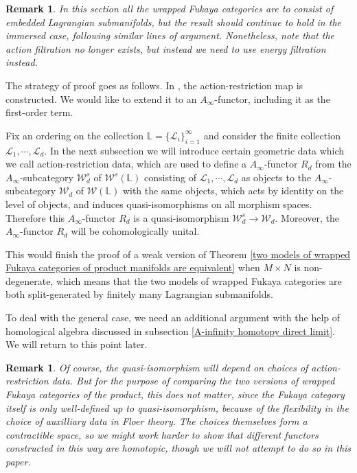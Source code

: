 \documentclass{amsart}
\newtheorem{remark}[theorem]{Remark}
\numberwithin{equation}{section}
\numberwithin{figure}{section}
\begin{document}
\begin{remark}
	In this section all the wrapped Fukaya categories are to consist of embedded Lagrangian submanifolds, but the result should continue to hold in the immersed case, following similar lines of argument. Nonetheless, note that the action filtration no longer exists, but instead we need to use energy filtration instead.
\end{remark}

	The strategy of proof goes as follows. In \cite{Gao1}, the action-restriction map is constructed. We would like to extend it to an $A_{\infty}$-functor, including it as the first-order term. \par
	Fix an ordering on the collection $\mathbb{L} = \{\mathcal{L}_{i}\}_{i=1}^{\infty}$ and consider the finite collection $\mathcal{L}_{1}, \cdots, \mathcal{L}_{d}$. In the next subsection we will introduce certain geometric data which we call action-restriction data, which are used to define a $A_{\infty}$-functor $R_{d}$ from the $A_{\infty}$-subcategory $\mathcal{W}^{s}_{d}$ of $\mathcal{W}^{s}(\mathbb{L})$ consisting of $\mathcal{L}_{1}, \cdots, \mathcal{L}_{d}$ as objects to the $A_{\infty}$-subcategory $\mathcal{W}_{d}$ of $\mathcal{W}(\mathbb{L})$ with the same objects, which acts by identity on the level of objects, and induces quasi-isomorphisms on all morphism spaces. Therefore this $A_{\infty}$-functor $R_{d}$ is a quasi-isomorphism $\mathcal{W}^{s}_{d} \to \mathcal{W}_{d}$. Moreover, the $A_{\infty}$-functor $R_{d}$ will be cohomologically unital. \par
	This would finish the proof of a weak version of Theorem \ref{two models of wrapped Fukaya categories of product manifolds are equivalent} when $M \times N$ is non-degenerate, which means that the two models of wrapped Fukaya categories are both split-generated by finitely many Lagrangian submanifolds.  \par
	To deal with the general case, we need an additional argument with the help of homological algebra discussed in subsection \ref{A-infinity homotopy direct limit}. We will return to this point later. \par
	
\begin{remark}
	Of course, the quasi-isomorphism will depend on choices of action-restriction data. But for the purpose of comparing the two versions of wrapped Fukaya categories of the product, this does not matter, since the Fukaya category itself is only well-defined up to quasi-isomorphism, because of the flexibility in the choice of auxilliary data in Floer theory. The choices themselves form a contractible space, so we might work harder to show that different functors constructed in this way are homotopic, though we will not attempt to do so in this paper.
\end{remark}
\end{document}
